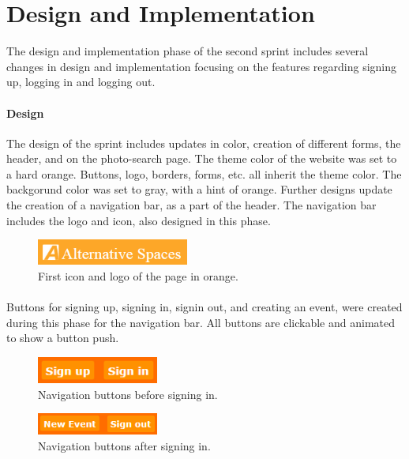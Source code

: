 \documentclass[11pt]{report}
\begin{document}
\section{Design and Implementation} 
The design and implementation phase of the second sprint includes several changes in design and implementation focusing on the features regarding signing up, logging in and logging out. 

\paragraph{Design}
The design of the sprint includes updates in color, creation of different forms, the header, and on the photo-search page. The theme color of the website was set to a hard orange. Buttons, logo, borders, forms, etc. all inherit the theme color. The backgorund color was set to gray, with a hint of orange. Further designs update the creation of a navigation bar, as a part of the header. The navigation bar includes the logo and icon, also designed in this phase. \\

\begin{figure}[ht!]
\centering
\includegraphics[width=50mm]{img/Sprint2-logo1.png}
\caption{First icon and logo of the page in orange. \label{overflow}}
\end{figure}

\paragraph{} Buttons for signing up, signing in, signin out, and creating an event, were created during this phase for the navigation bar. All buttons are clickable and animated to show a button push. \\

\begin{figure}[ht!]
\centering
\includegraphics[width=40mm]{img/Sprint2-buttons1.png}
\caption{Navigation buttons before signing in. \label{overflow}}
\end{figure}

\begin{figure}[ht!]
\centering
\includegraphics[width=40mm]{img/Sprint2-buttons2.png}
\caption{Navigation buttons after signing in. \label{overflow}}
\end{figure}
\end{document}
